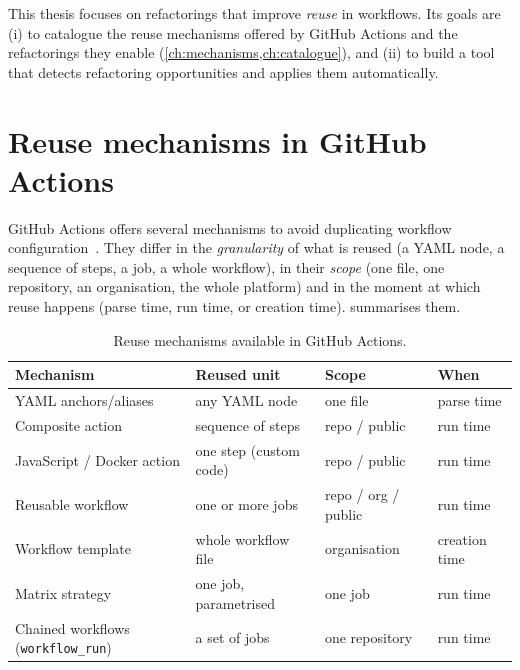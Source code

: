 \documentclass[a4paper,11pt,notitlepage]{report}
\theoremstyle{definition}
\begin{document}
This thesis focuses on refactorings that improve \emph{reuse} in workflows.
Its goals are (i) to catalogue the reuse mechanisms offered by GitHub Actions and the
refactorings they enable (\cref{ch:mechanisms,ch:catalogue}),
and (ii) to build a tool that detects refactoring opportunities and applies them automatically.

\chapter{Reuse mechanisms in GitHub Actions}
\label{ch:mechanisms}

GitHub Actions offers several mechanisms to avoid duplicating workflow
configuration~\cite{GHDocsReuse}. They differ in the \emph{granularity} of what is reused
(a YAML node, a sequence of steps, a job, a whole workflow), in their \emph{scope}
(one file, one repository, an organisation, the whole platform) and in the moment at which
reuse happens (parse time, run time, or creation time).
 summarises them.

\begin{table}[ht]
\centering\small
\begin{tabularx}{\textwidth}{@{}lXXl@{}}
\toprule
\textbf{Mechanism} & \textbf{Reused unit} & \textbf{Scope} & \textbf{When}\\
\midrule
YAML anchors/aliases~\cite{GHChangelogAnchors2025,YAML122} & any YAML node & one file & parse time\\
Composite action~\cite{GHDocsComposite} & sequence of steps & repo / public & run time\\
JavaScript / Docker action & one step (custom code) & repo / public & run time\\
Reusable workflow & one or more jobs & repo / org / public & run time\\
Workflow template~\cite{GHChangelogAnchors2025} & whole workflow file & organisation & creation time\\
Matrix strategy & one job, parametrised & one job & run time\\
Chained workflows (\texttt{workflow\_run}) & a set of jobs & one repository & run time\\
\bottomrule
\end{tabularx}
\caption{Reuse mechanisms available in GitHub Actions.}
\label{tab:mechanisms}
\end{table}
\end{document}
